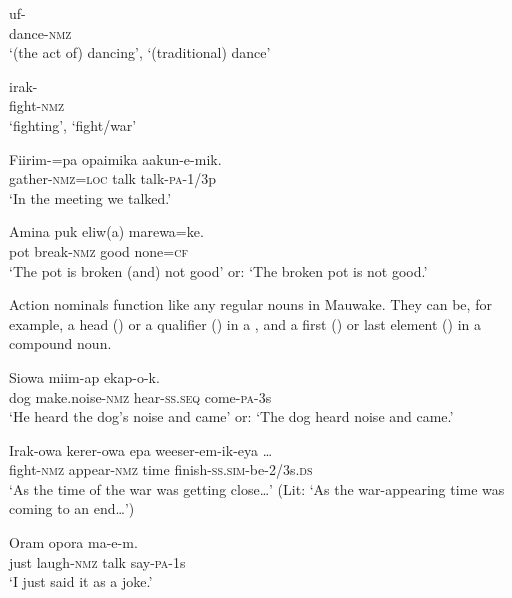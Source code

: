 \ea%
\label{ex:x62}
\gll uf- \\
dance-\textsc{nmz}\\
\glt`(the act of) dancing', `(traditional) dance'
\z

\ea%
\label{ex:x63}
\gll irak- \\
fight-\textsc{nmz}\\
\glt`fighting', `fight/war' 
\z 

\ea%
\label{ex:x1231}
\gll Fiirim-=pa opaimika aakun-e-mik. \\
gather-\textsc{nmz}=\textsc{loc} talk talk-\textsc{pa}-1/3p\\
\glt`In the meeting we talked.'
\z

\ea%
\label{ex:x1247}
\gll Amina puk eliw(a) marewa=ke. \\
pot break-\textsc{nmz} good none=\textsc{cf}\\
\glt`The pot is broken (and) not good' or: `The broken pot is not good.'
\z

Action nominals function like any regular nouns in Mauwake. They can be, for example, a head () or a qualifier () in a , and a first () or last element () in a compound noun.

\ea%
\label{ex:x64}
\gll Siowa  miim-ap ekap-o-k. \\
dog make.noise-\textsc{nmz} hear-\textsc{ss}.\textsc{seq} come-\textsc{pa}-3s\\
\glt`He heard the dog's noise and came' or: `The dog heard noise and came.'
\z

\ea%
\label{ex:x65}
\gll Irak-owa kerer-owa epa weeser-em-ik-eya {\dots}{\footnotemark} \\
fight-\textsc{nmz} appear-\textsc{nmz} time finish-\textsc{ss}.\textsc{sim}-be-2/3s.\textsc{ds}\\
\glt`As the time of the war was getting close{\dots}' (Lit: `As the war-appearing time was coming to an end{\dots}')
\z 


\ea%
\label{ex:x66}
\gll Oram  opora ma-e-m. \\
just laugh-\textsc{nmz} talk say-\textsc{pa}-1s\\
\glt`I just said it as a joke.'
\z

